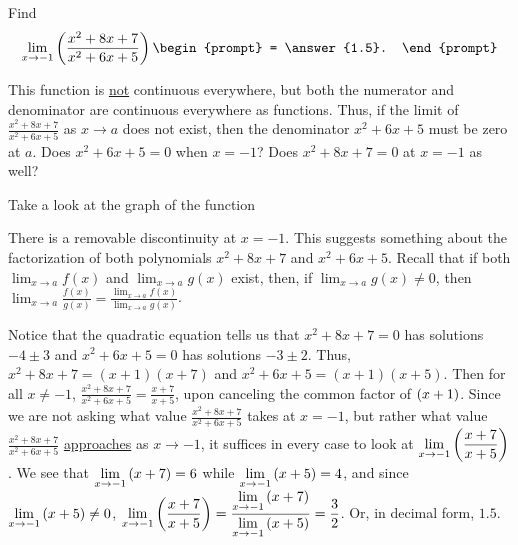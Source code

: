 \documentclass{ximera}
\author{Gregory Hartman \and Matthew Carr}
\begin{document}
\begin{exercise}



  Find 
  \[
  \lim_{x\to-1}\p{ \frac{x^2+8x+7}{x^2+6x+5}}
  \begin{prompt}
  = \answer{1.5}.
  \end{prompt}
  \]
    \begin{hint}
      This function is \underline{not} continuous everywhere, but both the numerator and denominator are continuous everywhere as functions. Thus, if the limit of $\frac{x^2+8x+7}{x^2+6x+5}$ as $x\to{a}$ does not exist, then the denominator $x^2+6x+5$ must be zero at $a$. Does $x^2+6x+5=0$ when $x=-1$? Does $x^2+8x+7=0$ at $x=-1$ as well?
    \end{hint}
     \begin{hint}
    Take a look at the graph of the function
    \begin{center}
      \end{center}
      There is a removable discontinuity at $x=-1$. This suggests something about the factorization of both polynomials $x^2+8x+7$ and $x^2+6x+5$. Recall that if both $\lim_{x\to a}f(x)$ and $\lim_{x\to a}g(x)$ exist, then, if $\lim_{x\to a}g(x)\ne0$, then $\lim_{x\to a}\frac{f(x)}{g(x)}=\frac{\lim_{x\to a}f(x)}{\lim_{x\to a}g(x)}$.
    \end{hint}
    \begin{hint}
     Notice that the quadratic equation tells us that $x^2+8x+7=0$ has solutions $-4\pm3$ and $x^2+6x+5=0$ has solutions $-3\pm{2}$. Thus, $x^2+8x+7=\left(x+1\right)\left(x+7\right)$ and $x^2+6x+5=\left(x+1\right)\left(x+5\right)$. Then for all $x\ne-1$, $\frac{x^2+8x+7}{x^2+6x+5}=\frac{x+7}{x+5}$, upon canceling the common factor of $\left(x+1\right)$. Since we are not asking what value $\frac{x^2+8x+7}{x^2+6x+5}$ takes at $x=-1$, but rather what value $\frac{x^2+8x+7}{x^2+6x+5}$ \underline{approaches} as $x\to-1$, it suffices in every case to look at $\lim_{x\to-1}\p{\frac{x+7}{x+5}}$. We see that $\lim_{x\to-1}\p{x+7}=6$ while $\lim_{x\to-1}\p{x+5}=4$, and since $\lim_{x\to-1}\p{x+5}\ne0$, $\lim_{x\to-1}\p{\frac{x+7}{x+5}}=\frac{\lim_{x\to-1}\p{x+7}}{\lim_{x\to-1}\p{x+5}}=\frac{3}{2}$. Or, in decimal form, $1.5$.
    \end{hint}
\end{exercise}
\end{document}
